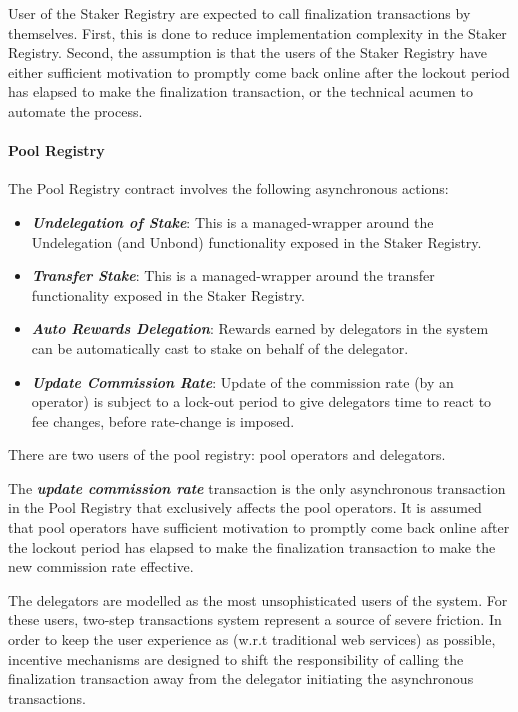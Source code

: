 User of the Staker Registry are expected to call finalization transactions by themselves. First, this is done to reduce implementation complexity in the Staker Registry. Second, the assumption is that the users of the Staker Registry have either sufficient motivation to promptly come back online after the lockout period has elapsed to make the finalization transaction, or the technical acumen to automate the process.  

\paragraph{Pool Registry} The Pool Registry contract involves the following asynchronous actions: 
\begin{itemize}
    \item \textit{\textbf{Undelegation of Stake}}: This is a managed-wrapper around the Undelegation (and Unbond) functionality exposed in the Staker Registry. 
    \item \textit{\textbf{Transfer Stake}}: This is a managed-wrapper around the transfer functionality exposed in the Staker Registry. 
    \item \textit{\textbf{Auto Rewards Delegation}}: Rewards earned by delegators in the system can be automatically cast to stake on behalf of the delegator.  
    \item \textit{\textbf{Update Commission Rate}}: Update of the commission rate (by an operator) is subject to a lock-out period to give delegators time to react to fee changes, before rate-change is imposed.   
\end{itemize}

There are two users of the pool registry: pool operators and delegators. 

The \textbf{\textit{update commission rate}} transaction is the only asynchronous transaction in the Pool Registry that exclusively affects the pool operators. It is assumed that pool operators have sufficient motivation to promptly come back online after the lockout period has elapsed to make the finalization transaction to make the new commission rate effective. 

The delegators are modelled as the most unsophisticated users of the system. For these users, two-step transactions system represent a source of severe friction. In order to keep the user experience as  (w.r.t traditional web services) as possible, incentive mechanisms are designed to shift the responsibility of calling the finalization transaction away from the delegator initiating the asynchronous transactions. 

